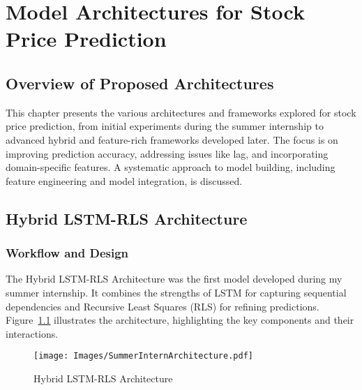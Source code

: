 \chapter{Model Architectures for Stock Price Prediction}

\section{Overview of Proposed Architectures}
This chapter presents the various architectures and frameworks explored for stock price prediction, from initial experiments during the summer internship to advanced hybrid and feature-rich frameworks developed later. The focus is on improving prediction accuracy, addressing issues like lag, and incorporating domain-specific features. A systematic approach to model building, including feature engineering and model integration, is discussed.

\section{Hybrid LSTM-RLS Architecture}

\subsection{Workflow and Design}
The Hybrid LSTM-RLS Architecture was the first model developed during my summer internship. It combines the strengths of LSTM for capturing sequential dependencies and Recursive Least Squares (RLS) for refining predictions. Figure~\ref{fig:summerarch} illustrates the architecture, highlighting the key components and their interactions.

\begin{figure}[h!]
    \centering
    \texttt{[image: Images/SummerInternArchitecture.pdf]} %
    \caption{Hybrid LSTM-RLS Architecture}
    \label{fig:summerarch}
\end{figure}

